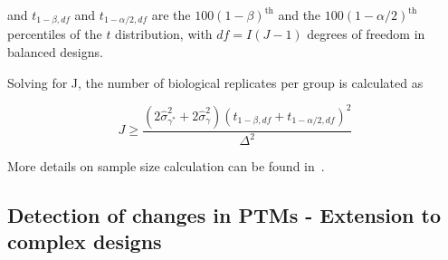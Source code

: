 \documentclass[mcp]{article}
\numberwithin{table}{section}
\begin{document}
and $t_{1-\beta, df}$ and $t_{1-\alpha /2, df}$ are the $100(1-\beta)^{\text{th}}$ and the $100(1-\alpha /2)^{\text{th}}$ percentiles of the $t$ distribution, with $df = I(J-1)$ degrees of freedom in balanced designs. 

Solving for J, the number of biological replicates per group is calculated as 

\begin{equation}
J \geq \frac{(2\hat{\sigma}_{\gamma^{\ast}}^{2} + 2\hat{\sigma}_{\gamma}^{2})(t_{1-\beta, df} + t_{1-\alpha /2, df})^2}{\Delta^2}
\end{equation}

More details on sample size calculation can be found in~\cite{oberg_vitek_09a}. 



\subsection*{Detection of changes in PTMs - Extension to complex designs}
\end{document}

